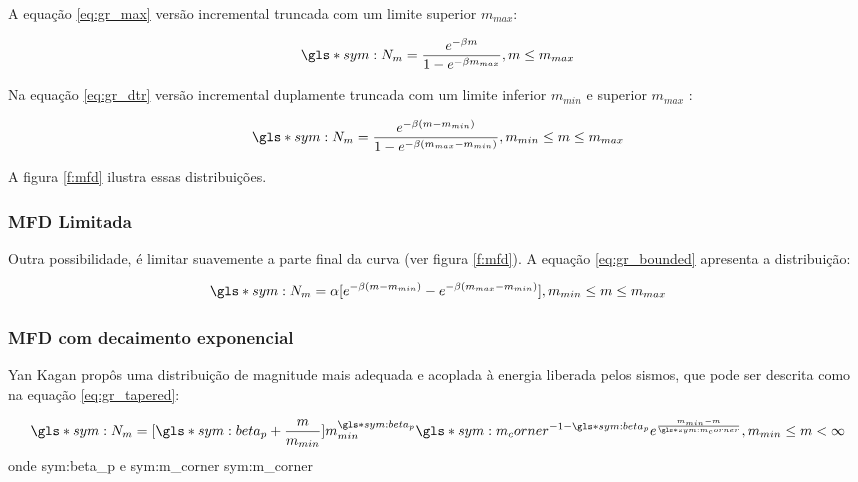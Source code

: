 A equação \eqref{eq:gr_max} versão incremental truncada com um limite superior $m_{max}$:

\begin{equation}
		\gls*{sym:N_m} = \frac{e^{-\beta m}}{1 -e^{-\beta m_{max}} }, m \leq m_{max}
	\label{eq:gr_max}
\end{equation}

Na equação \eqref{eq:gr_dtr} versão incremental duplamente truncada com um limite inferior $m_{min}$ e superior $m_{max}$ :

\begin{equation}
		\gls*{sym:N_m} = \frac{e^{-\beta (m - m_{min})}}{1 -e^{-\beta (m_{max} - m_{min}) } } , m_{min} \leq m \leq m_{max}
	\label{eq:gr_dtr}
\end{equation}

A figura \ref{f:mfd} ilustra essas distribuições.

\subsubsection{MFD Limitada}
\label{sec:BMFD}

Outra possibilidade, é limitar suavemente a parte final da curva (ver figura \ref{f:mfd}). A equação \eqref{eq:gr_bounded} apresenta
a distribuição:

\begin{equation}
		\gls*{sym:N_m} = \alpha [ e^{-\beta (m - m_{min})} - e^{-\beta (m_{max} - m_{min}) } ], m_{min} \leq m \leq m_{max}
	\label{eq:gr_bounded}
\end{equation}


\subsubsection{MFD com decaimento exponencial}
\label{sec:KMFD}

Yan Kagan \citep{kagan_2002} propôs uma distribuição de magnitude mais adequada e acoplada à energia liberada pelos sismos, que
pode ser descrita como na equação \eqref{eq:gr_tapered}:

\begin{equation}\ensuremath{
		\gls*{sym:N_m} = [\gls*{sym:beta_p} + \frac{m}{m_{min}}]
				m_{min}^{\gls*{sym:beta_p}}
				\gls*{sym:m_corner}^{-1 -\gls*{sym:beta_p}}
				e^{\frac{m_{min} - m}{\gls*{sym:m_corner}}}, 
				m_{min} \leq m < \infty
		}
	\label{eq:gr_tapered}
\end{equation}
onde \glsdesc*{sym:beta_p} e \gls*{sym:m_corner} \glsdesc*{sym:m_corner}

